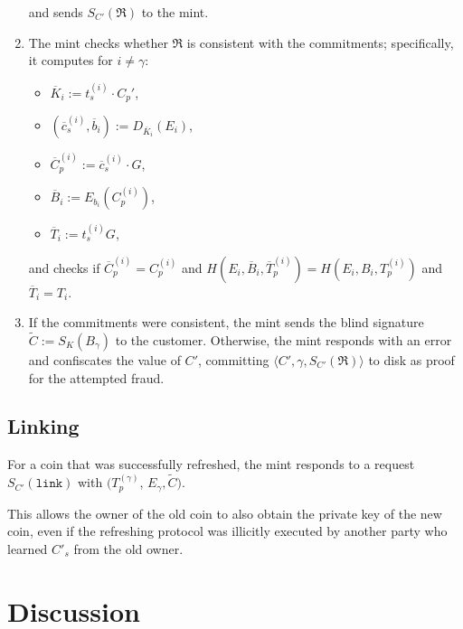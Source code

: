 \documentclass{llncs}
\begin{document}
\begin{enumerate}
        and sends $S_{C'}(\mathfrak{R})$ to the mint.
  \item \label{step:refresh-ccheck} The mint checks whether $\mathfrak{R}$ is consistent with the commitments;
        specifically, it computes for $i \not= \gamma$:
    \begin{itemize}
      \item $\overline{K}_i := t_s^{(i)} \cdot C_p'$,
      \item $(\overline{c}_s^{(i)}, \overline{b}_i) := D_{\overline{K}_i}(E_i)$,
      \item $\overline{C}^{(i)}_p := \overline{c}_s^{(i)} \cdot G$,
      \item $\overline{B}_i := E_{b_i}(C_p^{(i)})$,
      \item $\overline{T}_i := t_s^{(i)} G$,
    \end{itemize}
    and checks if $\overline{C}^{(i)}_p = C^{(i)}_p$ and $H(E_i, \overline{B}_i, \overline{T}^{(i)}_p) = H(E_i, B_i, T^{(i)}_p)$
    and $\overline{T}_i = T_i$.

  \item \label{step:refresh-done} If the commitments were consistent, the mint sends the blind signature
    $\widetilde{C} := S_{K}(B_\gamma)$ to the customer.
    Otherwise, the mint responds with an error and confiscates the value of $C'$,
    committing $\langle C', \gamma, S_{C'}(\mathfrak{R}) \rangle$ to disk as proof for the attempted fraud.
\end{enumerate}

%

\subsection{Linking}

For a coin that was successfully refreshed, the mint responds to
a request $S_{C'}(\mathtt{link})$ with $(T^{(\gamma)}_p$, $E_{\gamma}, \widetilde{C})$.

This allows the owner of the old coin to also obtain the private key
of the new coin, even if the refreshing protocol was illicitly
executed by another party who learned $C'_s$ from the old owner.


\section{Discussion}
\end{document}
